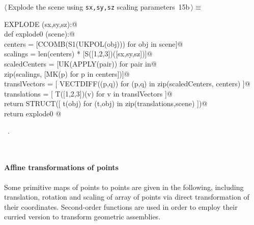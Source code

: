 \documentclass[11pt,oneside]{article}	%
\begin{document}
\begin{flushleft} \small
\begin{minipage}{\linewidth} \label{scrap31}
\protect{}$\langle\,$Explode the scene using \texttt{sx,sy,sz} scaling parameters\nobreak\ {\footnotesize 15b}$\,\rangle\equiv$
\vspace{-1ex}
\begin{list}{}{} \item
\mbox{}\verb@def EXPLODE (sx,sy,sz):@\\
\mbox{}\verb@    def explode0 (scene):@\\
\mbox{}\verb@        centers = [CCOMB(S1(UKPOL(obj))) for obj in scene]@\\
\mbox{}\verb@        scalings = len(centers) * [S([1,2,3])([sx,sy,sz])]@\\
\mbox{}\verb@        scaledCenters = [UK(APPLY(pair)) for pair in@\\
\mbox{}\verb@                         zip(scalings, [MK(p) for p in centers])]@\\
\mbox{}\verb@        translVectors = [ VECTDIFF((p,q)) for (p,q) in zip(scaledCenters, centers) ]@\\
\mbox{}\verb@        translations = [ T([1,2,3])(v) for v in translVectors ]@\\
\mbox{}\verb@        return STRUCT([ t(obj) for (t,obj) in zip(translations,scene) ])@\\
\mbox{}\verb@    return explode0  @\\
\mbox{}\verb@@{\NWsep}
\end{list}
\vspace{-1ex}
\footnotesize\addtolength{\baselineskip}{-1ex}
\begin{list}{}{\setlength{\itemsep}{-\parsep}\setlength{\itemindent}{-\leftmargin}}
\item \NWtxtMacroRefIn\ .
\end{list}
\end{minipage}\\[4ex]
\end{flushleft}

\paragraph{Affine transformations of points} Some primitive maps of points to points are given in the following, including translation, rotation and scaling of array of points via direct transformation of their coordinates. Second-order functions are used in order to employ their curried version to transform geometric assemblies.
\end{document}
